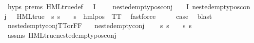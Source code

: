 \begin{isabellebody}
\ {\isachardoublequoteopen}{}{\isachardot}{\kern0pt}hyps{\isachardoublequoteclose}\ {\isachardoublequoteopen}{}{\isachardot}{\kern0pt}prems{\isachardoublequoteclose}\ HML{\isacharunderscore}{\kern0pt}true{\isacharunderscore}{\kern0pt}def\ {\isacartoucheopen}{\isasymforall}{\isasympsi}{\isasymin}{\isasymPhi}\ {\isacharbackquote}{\kern0pt}\ I{\isachardot}{\kern0pt}\ {\isasympsi}\ {\isasymnoteq}\ {\isasymphi}\ {\isasymlongrightarrow}\ nested{\isacharunderscore}{\kern0pt}empty{\isacharunderscore}{\kern0pt}pos{\isacharunderscore}{\kern0pt}conj\ {\isasympsi}{\isacartoucheclose}\ {\isacartoucheopen}{\isasymforall}{\isasympsi}{\isasymin}{\isasymPhi}\ {\isacharbackquote}{\kern0pt}\ I{\isachardot}{\kern0pt}\ nested{\isacharunderscore}{\kern0pt}empty{\isacharunderscore}{\kern0pt}pos{\isacharunderscore}{\kern0pt}conj\ {\isasympsi}\ {\isasymlongrightarrow}\ HML{\isacharunderscore}{\kern0pt}true\ {\isasympsi}{\isacartoucheclose}\ {\isacartoucheopen}{\isasymforall}s{\isachardot}{\kern0pt}\ {\isacharparenleft}{\kern0pt}s\ {\isasymTurnstile}\ {\isasymphi}{\isacharparenright}{\kern0pt}\ {\isacharequal}{\kern0pt}\ {\isacharparenleft}{\kern0pt}s\ {\isasymTurnstile}\ hml{\isacharunderscore}{\kern0pt}pos\ {\isasymalpha}\ TT{\isacharparenright}{\kern0pt}{\isacartoucheclose}\ \isamarkupfalse%
\ fastforce\isanewline
\ \ \isamarkupfalse%
\ \isamarkupfalse%
\ {\isacharquery}{\kern0pt}case\ \isamarkupfalse%
\ blast\isanewline
{}\isamarkupfalse%
\isanewline
\isanewline
{}\isamarkupfalse%
\ nested{\isacharunderscore}{\kern0pt}empty{\isacharunderscore}{\kern0pt}conj{\isacharunderscore}{\kern0pt}TT{\isacharunderscore}{\kern0pt}or{\isacharunderscore}{\kern0pt}FF{\isacharcolon}{\kern0pt}\isanewline
\ \ \ {\isachardoublequoteopen}nested{\isacharunderscore}{\kern0pt}empty{\isacharunderscore}{\kern0pt}conj\ {\isasymphi}{\isachardoublequoteclose}\isanewline
\ \ \ {\isachardoublequoteopen}{\isacharparenleft}{\kern0pt}{\isasymforall}s{\isachardot}{\kern0pt}\ {\isacharparenleft}{\kern0pt}s\ {\isasymTurnstile}\ {\isasymphi}{\isacharparenright}{\kern0pt}{\isacharparenright}{\kern0pt}\ {\isasymor}\ {\isacharparenleft}{\kern0pt}{\isasymforall}s{\isachardot}{\kern0pt}\ {\isasymnot}{\isacharparenleft}{\kern0pt}s\ {\isasymTurnstile}\ {\isasymphi}{\isacharparenright}{\kern0pt}{\isacharparenright}{\kern0pt}{\isachardoublequoteclose}\isanewline
\ \ \isamarkupfalse%
\ assms\ HML{\isacharunderscore}{\kern0pt}true{\isacharunderscore}{\kern0pt}nested{\isacharunderscore}{\kern0pt}empty{\isacharunderscore}{\kern0pt}pos{\isacharunderscore}{\kern0pt}conj\isanewline

\end{isabellebody}
